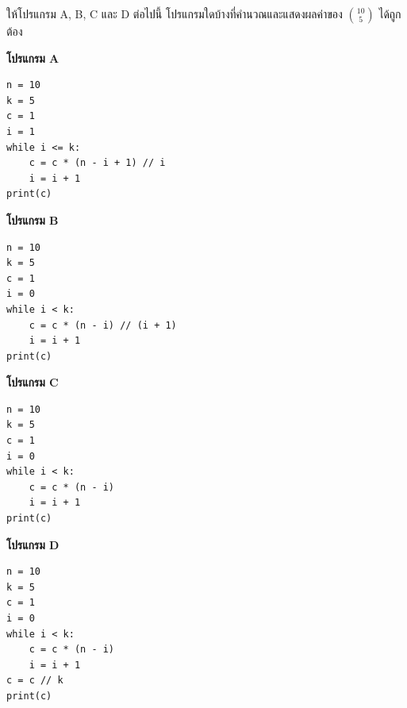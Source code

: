 \question ให้โปรแกรม A, B, C และ D ต่อไปนี้ โปรแกรมใดบ้างที่คำนวณและแสดงผลค่าของ $\binom{10}{5}$ ได้ถูกต้อง

\begin{center}
\begin{minipage}[t]{0.45\textwidth}
\textbf{โปรแกรม A}
\begin{verbatim}
n = 10
k = 5
c = 1
i = 1
while i <= k:
    c = c * (n - i + 1) // i
    i = i + 1
print(c)
\end{verbatim}
\end{minipage}
\hfill
\begin{minipage}[t]{0.45\textwidth}
\textbf{โปรแกรม B}
\begin{verbatim}
n = 10
k = 5
c = 1
i = 0
while i < k:
    c = c * (n - i) // (i + 1)
    i = i + 1
print(c)
\end{verbatim}
\end{minipage}

\vspace{6pt}

\begin{minipage}[t]{0.45\textwidth}
\textbf{โปรแกรม C}
\begin{verbatim}
n = 10
k = 5
c = 1
i = 0
while i < k:
    c = c * (n - i)
    i = i + 1
print(c)
\end{verbatim}
\end{minipage}
\hfill
\begin{minipage}[t]{0.45\textwidth}
\textbf{โปรแกรม D}
\begin{verbatim}
n = 10
k = 5
c = 1
i = 0
while i < k:
    c = c * (n - i)
    i = i + 1
c = c // k
print(c)
\end{verbatim}
\end{minipage}
\end{center}


